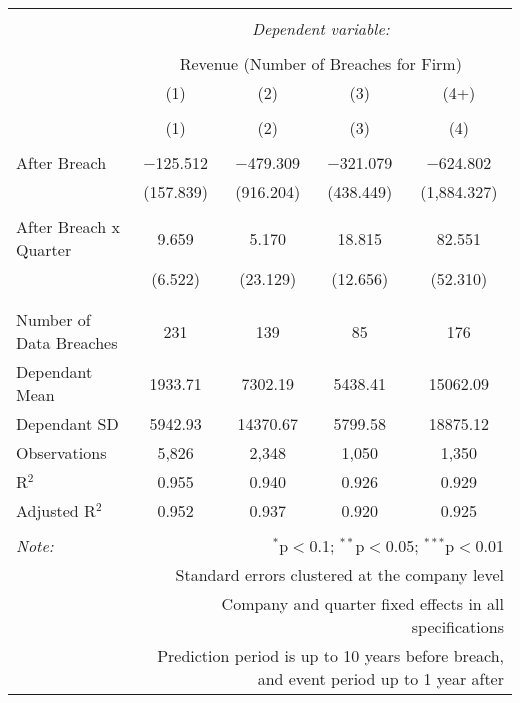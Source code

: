 
\begin{table}[!htbp] \centering 
  \caption{} 
  \label{} 
\begin{tabular}{@{\extracolsep{5pt}}lcccc} 
\\[-1.8ex]\hline 
\hline \\[-1.8ex] 
 & \multicolumn{4}{c}{\textit{Dependent variable:}} \\ 
\cline{2-5} 
\\[-1.8ex] & \multicolumn{4}{c}{Revenue (Number of Breaches for Firm)} \\ 
 & (1) & (2) & (3) & (4+) \\ 
\\[-1.8ex] & (1) & (2) & (3) & (4)\\ 
\hline \\[-1.8ex] 
 After Breach & $-$125.512 & $-$479.309 & $-$321.079 & $-$624.802 \\ 
  & (157.839) & (916.204) & (438.449) & (1,884.327) \\ 
  & & & & \\ 
 After Breach x Quarter & 9.659 & 5.170 & 18.815 & 82.551 \\ 
  & (6.522) & (23.129) & (12.656) & (52.310) \\ 
  & & & & \\ 
\hline \\[-1.8ex] 
Number of Data Breaches  & 231 & 139 & 85 & 176 \\ 
Dependant Mean & 1933.71 & 7302.19 & 5438.41 & 15062.09 \\ 
Dependant SD & 5942.93 & 14370.67 & 5799.58 & 18875.12 \\ 
Observations & 5,826 & 2,348 & 1,050 & 1,350 \\ 
R$^{2}$ & 0.955 & 0.940 & 0.926 & 0.929 \\ 
Adjusted R$^{2}$ & 0.952 & 0.937 & 0.920 & 0.925 \\ 
\hline 
\hline \\[-1.8ex] 
\textit{Note:}  & \multicolumn{4}{r}{$^{*}$p$<$0.1; $^{**}$p$<$0.05; $^{***}$p$<$0.01} \\ 
 & \multicolumn{4}{r}{Standard errors clustered at the company level} \\ 
 & \multicolumn{4}{r}{Company and quarter fixed effects in all specifications} \\ 
 & \multicolumn{4}{r}{Prediction period is up to 10 years before breach, and event period up to 1 year after} \\ 
\end{tabular} 
\end{table} 
